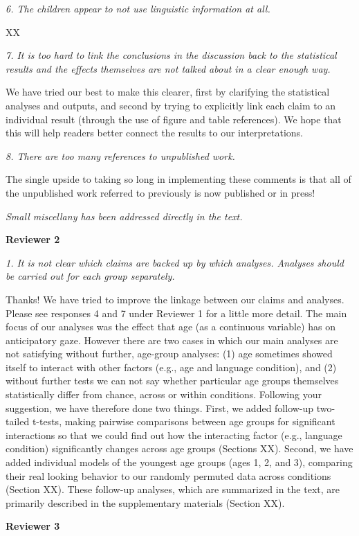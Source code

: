\documentclass[a4paper]{letter}
\begin{document}
\begin{letter}{}
\newpage

\textit{6. The children appear to not use linguistic information at all.}

XX

\smallskip

\textit{7. It is too hard to link the conclusions in the discussion back to the statistical results and the effects themselves are not talked about in a clear enough way.}

We have tried our best to make this clearer, first by clarifying the statistical analyses and outputs, and second by trying to explicitly link each claim to an individual result (through the use of figure and table references). We hope that this will help readers better connect the results to our interpretations.

\smallskip

\textit{8. There are too many references to unpublished work.}

The single upside to taking so long in implementing these comments is that all of the unpublished work referred to previously is now published or in press!

\smallskip

\textit{Small miscellany has been addressed directly in the text.}

\bigskip

\textbf{Reviewer 2}

\textit{1. It is not clear which claims are backed up by which analyses. Analyses should be carried out for each group separately.}

Thanks! We have tried to improve the linkage between our claims and analyses. Please see responses 4 and 7 under Reviewer 1 for a little more detail. The main focus of our analyses was the effect that age (as a continuous variable) has on anticipatory gaze. However there are two cases in which our main analyses are not satisfying without further, age-group analyses: (1) age sometimes showed itself to interact with other factors (e.g., age and language condition), and (2) without further tests we can not say whether particular age groups themselves statistically differ from chance, across or within conditions. Following your suggestion, we have therefore done two things. First, we added follow-up two-tailed t-tests, making pairwise comparisons between age groups for significant interactions so that we could find out how the interacting factor (e.g., language condition) significantly changes across age groups (Sections XX). Second, we have added individual models of the youngest age groups (ages 1, 2, and 3), comparing their real looking behavior to our randomly permuted data across conditions (Section XX). These follow-up analyses, which are summarized in the text, are primarily described in the supplementary materials (Section XX).

\smallskip

\textbf{Reviewer 3}


\end{letter}
\end{document}
